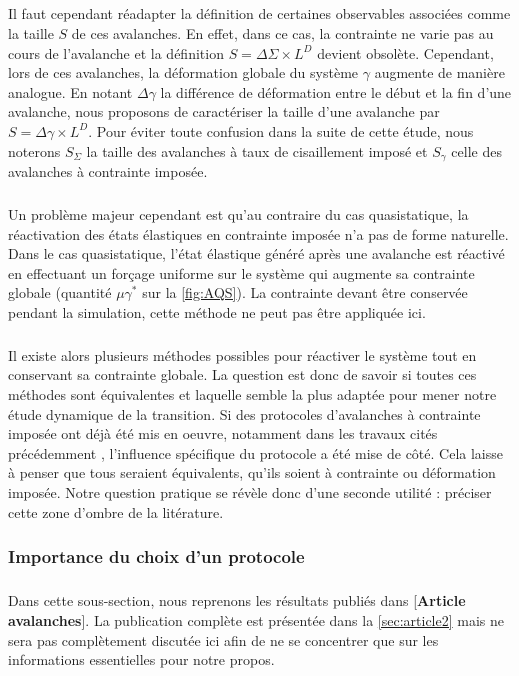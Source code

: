 \subparagraph{}Il faut cependant réadapter la définition de certaines observables associées comme la taille $S$ de ces avalanches. En effet, dans ce cas, la contrainte ne varie pas au cours de l'avalanche et la définition $S=\Delta\Sigma \times L^D$ devient obsolète. Cependant, lors de ces avalanches, la déformation globale du système $\gamma$ augmente de manière analogue. En notant $\Delta\gamma$ la différence de déformation entre le début et la fin d'une avalanche, nous proposons de caractériser la taille d'une avalanche par $S=\Delta\gamma \times L^D$. Pour éviter toute confusion dans la suite de cette étude, nous noterons $S_\Sigma$ la taille des avalanches à taux de cisaillement imposé et $S_\gamma$ celle des avalanches à contrainte imposée.

\subparagraph{}Un problème majeur cependant est qu'au contraire du cas quasistatique, la réactivation des états élastiques en contrainte imposée n'a pas de forme naturelle. Dans le cas quasistatique, l'état élastique généré après une avalanche est réactivé en effectuant un forçage uniforme sur le système qui augmente sa contrainte globale (quantité $\mu\gamma^*$ sur la \autoref{fig:AQS}). La contrainte devant être conservée pendant la simulation, cette méthode ne peut pas être appliquée ici.

\subparagraph{}Il existe alors plusieurs méthodes possibles pour réactiver le système tout en conservant sa contrainte globale. La question est donc de savoir si toutes ces méthodes sont équivalentes et laquelle semble la plus adaptée pour mener notre étude dynamique de la transition. Si des protocoles d'avalanches à contrainte imposée ont déjà été mis en oeuvre, notamment dans les travaux cités précédemment \cite{budrikis_universal_2017, lin_scaling_2014}, l'influence spécifique du protocole a été mise de côté. Cela laisse à penser que tous seraient équivalents, qu'ils soient à contrainte ou déformation imposée. Notre question pratique se révèle donc d'une seconde utilité : préciser cette zone d'ombre de la litérature.

\subsubsection{Importance du choix d'un protocole}

\label{sec:imp_prot}

\subparagraph{}Dans cette sous-section, nous reprenons les résultats publiés dans [\textbf{Article avalanches}]. La publication complète est présentée dans la \autoref{sec:article2} mais ne sera pas complètement discutée ici afin de ne se concentrer que sur les informations essentielles pour notre propos.

